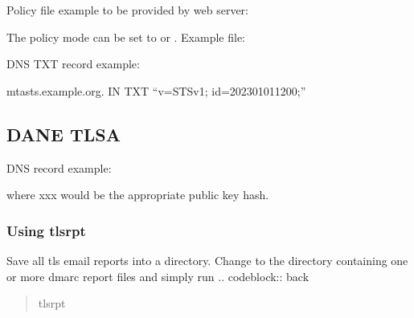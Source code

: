 \documentclass[letterpaper,10pt,english]{sphinxmanual}
\begin{document}
\sphinxAtStartPar
Policy file example to be provided by web server:

\begin{sphinxVerbatim}[commandchars=\\\{\}]
\end{sphinxVerbatim}

\sphinxAtStartPar
The policy mode can be set to  or .
Example  file:

\begin{sphinxVerbatim}[commandchars=\\\{\}]
 
 
 
 \PYGZbs{}
 
\end{sphinxVerbatim}

\sphinxAtStartPar
DNS TXT record example:

\begin{sphinxVerbatim}[commandchars=\\\{\}]
\PYGZus{}mta\PYGZhy{}sts.example.org.  IN TXT “v=STSv1; id=202301011200;”
\end{sphinxVerbatim}


\subsection{DANE TLSA}
\label{\detokenize{Readme-TLS:dane-tlsa}}
\sphinxAtStartPar
DNS record example:

\begin{sphinxVerbatim}[commandchars=\\\{\}]
     
\end{sphinxVerbatim}

\sphinxAtStartPar
where xxx would be the appropriate public key hash.


\subsubsection{Using tls\sphinxhyphen{}rpt}
\label{\detokenize{Readme-TLS:using-tls-rpt}}
\sphinxAtStartPar
Save all tls email reports into a directory.
Change to the directory containing one or more dmarc report files and simply run
.. code\sphinxhyphen{}block:: back
\begin{quote}

\sphinxAtStartPar
tls\sphinxhyphen{}rpt
\end{quote}
\end{document}
